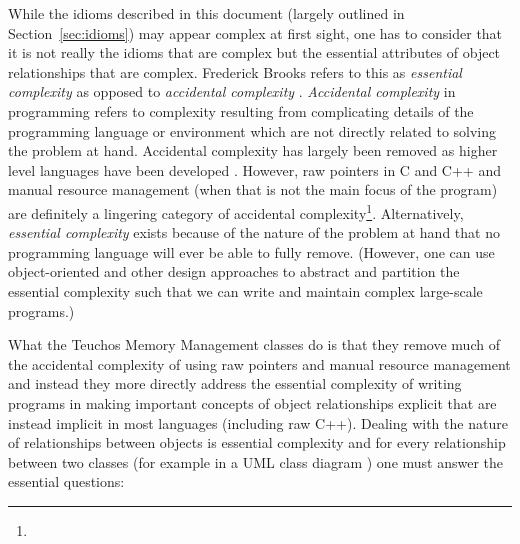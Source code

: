 \documentclass[pdf,ps2pdf,11pt]{SANDreport}
\begin{document}
While the idioms described in this document (largely outlined in
Section~\ref{sec:idioms}) may appear complex at first sight, one has
to consider that it is not really the idioms that are complex but the
essential attributes of object relationships that are complex.
Frederick Brooks refers to this as {}\textit{essential complexity} as
opposed to {}\textit{accidental complexity}
{}\cite{MythicalManMonth95}.  {}\textit{Accidental complexity} in
programming refers to complexity resulting from complicating details
of the programming language or environment which are not directly
related to solving the problem at hand.  Accidental complexity has
largely been removed as higher level languages have been developed
{}\cite[Chapter 16]{MythicalManMonth95}.  However, raw pointers in C
and C++ and manual resource management (when that is not the main
focus of the program) are definitely a lingering category of
accidental complexity\footnote{
{}}.
Alternatively, {}\textit{essential complexity} exists because of the
nature of the problem at hand that no programming language will ever
be able to fully remove.  (However, one can use object-oriented and
other design approaches to abstract and partition the essential
complexity such that we can write and maintain complex large-scale
programs.)

What the Teuchos Memory Management classes do is that they remove much
of the accidental complexity of using raw pointers and manual resource
management and instead they more directly address the essential
complexity of writing programs in making important concepts of object
relationships explicit that are instead implicit in most languages
(including raw C++).  Dealing with the nature of relationships between
objects is essential complexity and for every relationship between two
classes (for example in a UML class diagram
{}\cite{UMLDistilledThirdEdition04}) one must answer the essential
questions:
\end{document}
